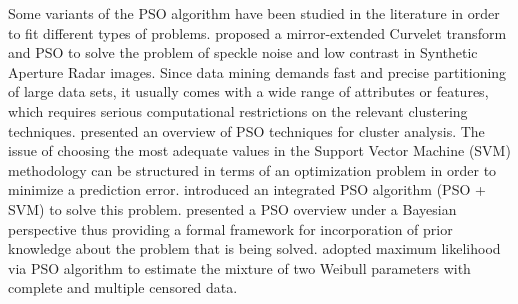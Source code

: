 \documentclass[10pt,letterpaper]{article}
\begin{document}
Some variants of the PSO algorithm have been studied in the literature in order to fit different types of problems. \cite{yingetal2010} proposed a mirror-extended Curvelet transform and PSO to solve the problem of speckle noise and low contrast in Synthetic Aperture Radar images. Since data mining demands fast and precise partitioning of large data sets, it usually comes with a wide range of attributes or features, which requires serious computational
restrictions on the relevant clustering techniques. \cite{khanetal2010} presented an overview of PSO techniques for cluster analysis.
The issue of choosing the most adequate values in the Support Vector Machine (SVM) methodology can be structured in terms of an optimization problem
in order to minimize a prediction error. \cite{linsetal2012} introduced an integrated PSO algorithm (PSO + SVM) to solve this problem.
\cite{andras2012} presented a PSO overview under a Bayesian perspective thus providing a formal framework for incorporation of prior knowledge about the
problem that is being solved. \cite{wanghuang2013} adopted maximum likelihood via PSO algorithm to estimate the mixture of two Weibull
parameters with complete and multiple censored data.

\end{document}
